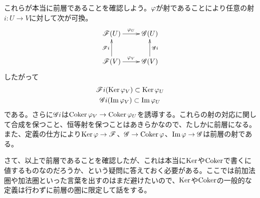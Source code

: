 \begin{rem}
  これらが本当に前層であることを確認しよう。${\varphi}$が射であることにより任意の射$i \colon U \to V$に対して次が可換。
  \[
  \xymatrix{
  \scrf(U) \ar[r]^-{\vp_U} & \scrg(U) \\
  \scrf(V) \ar[r]^-{\vp_V} \ar[u]^-{\scrf i} & \scrg(V) \ar[u]_-{\scrg i}
  }
  \]
  したがって
  \begin{gather*}
    \mathscr{F} i (\operatorname{Ker} {\varphi}_V) \subset \operatorname{Ker} {\varphi}_U \\
        \mathscr{G} i (\operatorname{Im} {\varphi}_V) \subset \operatorname{Im} {\varphi}_U
  \end{gather*}
  である。さらに$\mathscr{G} i$は$\operatorname{Coker} {\varphi}_V \to \operatorname{Coker} {\varphi}_U$を誘導する。これらの射の対応に関して合成を保つこと、恒等射を保つことはあきらかなので、たしかに前層になる。また、定義の仕方により$\operatorname{Ker} {\varphi} \to \mathscr{F}$、$\mathscr{G} \to \operatorname{Coker} {\varphi}$、$\operatorname{Im} {\varphi} \to \mathscr{G}$は前層の射である。

  さて、以上で前層であることを確認したが、これは本当に$\operatorname{Ker}$や$\operatorname{Coker}$で書くに値するものなのだろうか、という疑問に答えておく必要がある。ここでは前加法圏や加法圏といった言葉を出すのはまだ避けたいので、$\operatorname{Ker}$や$\operatorname{Coker}$の一般的な定義は行わずに前層の圏に限定して話をする。
\end{rem}


